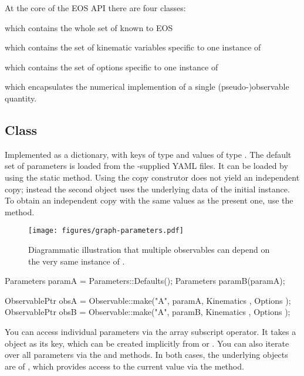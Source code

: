 At the core of the EOS API there are four classes:
\begin{description}[leftmargin=!,labelwidth=.15\textwidth]
    \item[\class{Parameters}]
        which contains the whole set of  known to EOS
    \item[\class{Kinematics}]
        which contains the set of kinematic variables specific to one
        instance of 
    \item[\class{Options}]
        which contains the set of options specific to one instance of
    \item[\class{Observable}]
        which encapsulates the numerical implemention of a single
        (pseudo-)observable quantity.
\end{description}

\subsection{Class }

Implemented as a dictionary, with keys of type  and values of type
. The default set of parameters is loaded from the \EOS-supplied YAML files. It can be
loaded by using the static  method. Using the copy construtor does not yield
an independent copy; instead the second object uses the underlying data of the initial
instance. To obtain an independent copy with the same values as the present one, use
the  method.

\begin{figure}[t]
    \centering
    \texttt{[image: figures/graph-parameters.pdf]}
    \caption{%
        Diagrammatic illustration that multiple observables can depend on the
        very same instance of .
    }
\end{figure}

\begin{sourcecode}
Parameters paramA = Parameters::Defaults();
Parameters paramB(paramA);

ObservablePtr obsA = Observable::make("A", paramA, Kinematics{ }, Options{ });
ObservablePtr obsB = Observable::make("A", paramB, Kinematics{ }, Options{ });
\end{sourcecode}

You can access individual parameters via the array subscript operator. It takes
a  object as its key, which can be created implicitly
from  or . You can also iterate over all
parameters via the  and  methods. In both cases, the
underlying objects are of , which provides access to
the current value via the  method.


